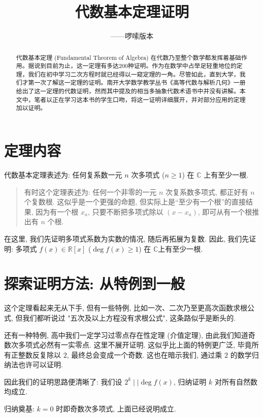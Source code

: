 \documentclass[UTF8,a4paper,12pt]{ctexart}
\title{代数基本定理证明}
\subtitle{——啰嗦版本}
\date{}
\makeatletter
\renewcommand{\maketitle}{%
  \begin{center}
    {\LARGE\bfseries \@title\par}
    \vspace{0.55em}
    {\large \@subtitle\par}
  \end{center}
}
\makeatother
\begin{document}
\maketitle

\begin{abstract}
  代数基本定理 (Fundamental Theorem of Algebra) 在代数乃至整个数学都发挥着基础作用。据说\cite{bdbaike1}到目前为止，这一定理有多达200种证明。作为在数学中占举足轻重地位的定理，我们在初中学习二次方程时就已经得以一窥定理的一角。尽管如此，直到大学，我们才第一次了解这一定理的证明。南开大学数学教学丛书《高等代数与解析几何》一册给出了这一定理的代数证明\cite{nkalg}，然而其中提及的相当多抽象代数术语书中并没有讲解。本文中，笔者以正在学习这本书的学生口吻，将这一证明详细展开，并对部分应用的定理加以证明。
\end{abstract}

\section{定理内容}

代数基本定理表述为: 任何复系数一元 $n$ 次多项式 ($n\geq1$) 在 $\mathbb{C}$ 上有至少一根.

\begin{quote}
  有时这个定理表述为: 任何一个非零的一元 $n$ 次复系数多项式, 都正好有 $n$ 个复数根. 这似乎是一个更强的命题, 但实际上是“至少有一个根”的直接结果, 因为有一个根 $x_a$, 只要不断把多项式除以 $(x-x_a)$, 即可从有一个根推出有 $n$ 个根.
\end{quote}

在这里, 我们先证明多项式系数为实数的情况, 随后再拓展为复数. 因此, 我们先证明: 多项式 $f(x)\in\mathbb{R}[x]$ ($\deg f(x)\geq 1$) 在 $\mathbb{C}$上有至少一根.

\section{探索证明方法: 从特例到一般}
这个定理看起来无从下手, 但有一些特例, 比如一次、二次乃至更高次函数求根公式, 但我们都听说过 "五次及以上方程没有求根公式", 这条路似乎是断头的.

还有一种特例, 高中我们一定学习过零点存在性定理 (介值定理), 由此我们知道奇数次多项式必然有一实零点. 这里不展开证明.
这似乎比上面的特例更广泛, 毕竟所有正整数反复除以 $2$, 最终总会变成一个奇数. 这也在暗示我们, 通过乘 $2$ 的数学归纳法也许可以证明.

因此我们的证明思路便清晰了: 我们设 $2^k\mid\mid\deg f(x)$, 归纳证明 $k$ 对所有自然数均成立.

归纳奠基: $k=0$ 时即奇数次多项式, 上面已经说明成立.
\end{document}
